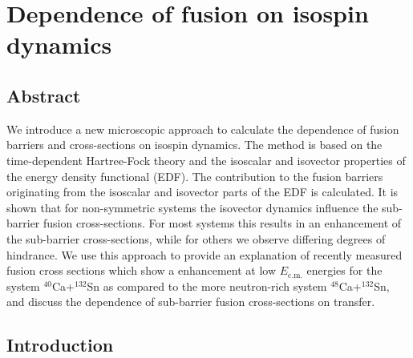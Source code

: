 
\chapter{Dependence of fusion on isospin dynamics}\label{chapters:chapter_2}
\vspace{-7mm}

\author{K. Godbey}

\author{A.S. Umar}

\author{C. Simenel}



\section*{Abstract}
	We introduce a new microscopic approach to calculate the dependence of fusion barriers and cross-sections on
	isospin dynamics. The method is based on the time-dependent Hartree-Fock theory and
	the isoscalar and isovector properties of the energy density functional (EDF). The contribution to
	the fusion barriers originating from the isoscalar and isovector parts of the EDF is calculated.
	It is shown that for non-symmetric systems the isovector dynamics influence the sub-barrier fusion
	cross-sections. For most systems this results in an enhancement of the sub-barrier cross-sections,
	while for others we observe differing degrees of hindrance.
	We use this approach to provide an explanation of recently measured fusion cross sections which show a  enhancement at low $E_\mathrm{c.m.}$ energies
	for the system $^{40}$Ca+$^{132}$Sn as compared to the more neutron-rich system
	$^{48}$Ca+$^{132}$Sn, and discuss the dependence of sub-barrier fusion cross-sections on transfer.
	
\section{Introduction}

